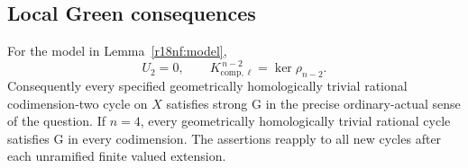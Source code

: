 \subsection{Local Green consequences}

\begin{theorem}
\label{r18nf:theorem}
For the model in Lemma~\ref{r18nf:model},
\[
                       U_2=0,
 \qquad
 K_{\mathrm{comp},\ell}^{\,n-2}=\ker\rho_{n-2}.
 \tag{NF18.9}\label{r18nf:vanishing}
\]
Consequently every specified geometrically homologically
trivial rational codimension-two cycle on $X$ satisfies
strong G in the precise ordinary-actual sense of the question.
If $n=4$, every geometrically homologically trivial rational
cycle satisfies G in every codimension.
The assertions reapply to all new cycles after each
unramified finite valued extension.
\end{theorem}

